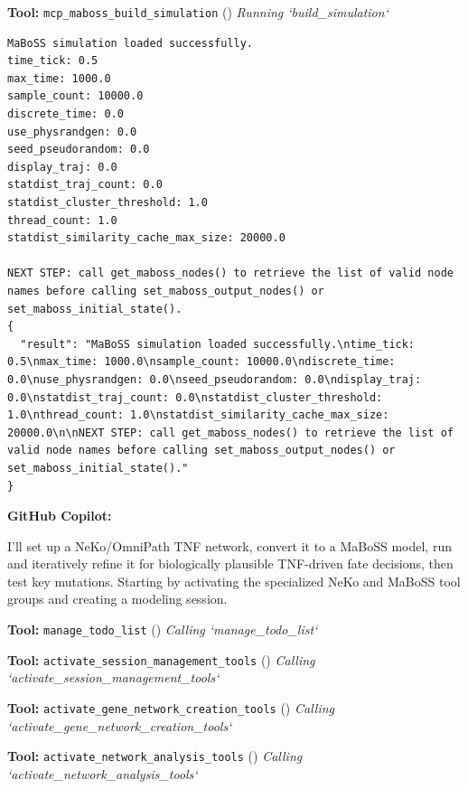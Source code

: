 \documentclass[11pt,a4paper]{article}
\begin{document}
\begin{toolokbox}
\textbf{Tool:} \texttt{mcp\_maboss\_build\_simulation} (\checkmark)
\textit{Running `build\_simulation`}
\begin{lstlisting}
MaBoSS simulation loaded successfully.
time_tick: 0.5
max_time: 1000.0
sample_count: 10000.0
discrete_time: 0.0
use_physrandgen: 0.0
seed_pseudorandom: 0.0
display_traj: 0.0
statdist_traj_count: 0.0
statdist_cluster_threshold: 1.0
thread_count: 1.0
statdist_similarity_cache_max_size: 20000.0

NEXT STEP: call get_maboss_nodes() to retrieve the list of valid node names before calling set_maboss_output_nodes() or set_maboss_initial_state().
{
  "result": "MaBoSS simulation loaded successfully.\ntime_tick: 0.5\nmax_time: 1000.0\nsample_count: 10000.0\ndiscrete_time: 0.0\nuse_physrandgen: 0.0\nseed_pseudorandom: 0.0\ndisplay_traj: 0.0\nstatdist_traj_count: 0.0\nstatdist_cluster_threshold: 1.0\nthread_count: 1.0\nstatdist_similarity_cache_max_size: 20000.0\n\nNEXT STEP: call get_maboss_nodes() to retrieve the list of valid node names before calling set_maboss_output_nodes() or set_maboss_initial_state()."
}
\end{lstlisting}
\end{toolokbox}
\begin{copilotbox}
\textbf{GitHub Copilot:}

I'll set up a NeKo/OmniPath TNF network, convert it to a MaBoSS model, run and iteratively refine it for biologically plausible TNF-driven fate decisions, then test key mutations. Starting by activating the specialized NeKo and MaBoSS tool groups and creating a modeling session.

\end{copilotbox}
\begin{toolokbox}
\textbf{Tool:} \texttt{manage\_todo\_list} (\checkmark)
\textit{Calling `manage\_todo\_list`}
\end{toolokbox}
\begin{toolokbox}
\textbf{Tool:} \texttt{activate\_session\_management\_tools} (\checkmark)
\textit{Calling `activate\_session\_management\_tools`}
\end{toolokbox}
\begin{toolokbox}
\textbf{Tool:} \texttt{activate\_gene\_network\_creation\_tools} (\checkmark)
\textit{Calling `activate\_gene\_network\_creation\_tools`}
\end{toolokbox}
\begin{toolokbox}
\textbf{Tool:} \texttt{activate\_network\_analysis\_tools} (\checkmark)
\textit{Calling `activate\_network\_analysis\_tools`}
\end{toolokbox}
\end{document}
